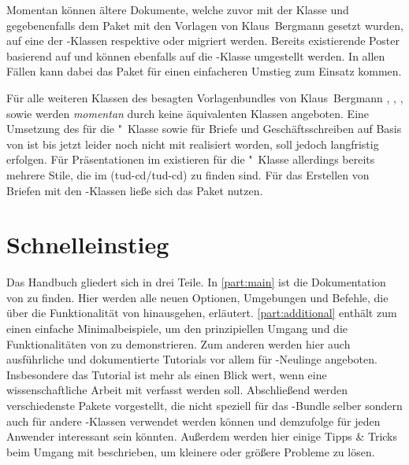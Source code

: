 Momentan können ältere Dokumente, welche zuvor mit der Klasse 
 und gegebenenfalls dem Paket 
 mit den Vorlagen von Klaus~Bergmann 
gesetzt wurden, auf eine der \TUDScript-Klassen  respektive 
 oder  migriert werden. Bereits 
existierende Poster basierend auf  und 
 können ebenfalls auf die 
\TUDScript-Klasse  umgestellt werden. In allen Fällen kann 
dabei das Paket  für einen einfacheren Umstieg zum Einsatz 
kommen. 

Für alle weiteren Klassen des besagten Vorlagenbundles von Klaus~Bergmann
, ,
,  sowie
 werden \emph{momentan} durch \TUDScript
keine äquivalenten Klassen angeboten.
%
Eine Umsetzung des \CDs für die "~Klasse sowie für Briefe und 
Geschäftsschreiben auf Basis von \KOMAScript{} ist bis jetzt leider noch nicht 
mit \TUDScript realisiert worden, soll jedoch langfristig erfolgen. Für 
Präsentationen im \TUDCD existieren für die "~Klasse allerdings 
bereits mehrere Stile, die im \GitHubRepo(tud-cd/tud-cd) zu finden sind. 
Für das Erstellen von Briefen mit den \TUDScript-Klassen ließe sich das Paket 
 nutzen.



\section{Schnelleinstieg}

Das Handbuch gliedert sich in drei Teile. In \autoref{part:main} ist die 
Dokumentation von \TUDScript zu finden. Hier werden alle neuen Optionen, 
Umgebungen und Befehle, die über die Funktionalität von \KOMAScript{} 
hinausgehen, erläutert. \autoref{part:additional} enthält zum einen einfache 
Minimalbeispiele, um den prinzipiellen Umgang und die Funktionalitäten von 
\TUDScript zu demonstrieren. Zum anderen werden hier auch ausführliche und 
dokumentierte Tutorials vor allem für -Neulinge angeboten. 
Insbesondere das Tutorial  ist mehr als einen Blick wert, 
wenn eine wissenschaftliche Arbeit mit  verfasst werden soll.
Abschließend werden verschiedenste Pakete vorgestellt, die nicht speziell für 
das \TUDScript-Bundle selber sondern auch für andere -Klassen
verwendet werden können und demzufolge für jeden Anwender interessant sein 
könnten. Außerdem werden hier einige Tipps \& Tricks beim Umgang mit 
 beschrieben, um kleinere oder größere Probleme zu lösen.

